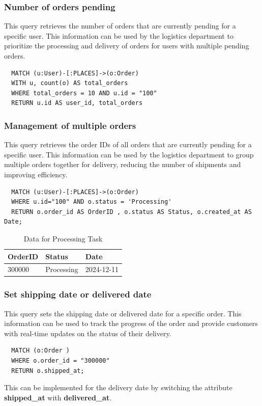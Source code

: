\documentclass[a4paper,12pt]{article}
\begin{document}
\subsubsection{Number of orders pending}
This query retrieves the number of orders that are currently pending for a specific user. This information can be used by the logistics department to prioritize the processing and delivery of orders for users with multiple pending orders.
\begin{verbatim}
  MATCH (u:User)-[:PLACES]->(o:Order)
  WITH u, count(o) AS total_orders
  WHERE total_orders = 10 AND u.id = "100"
  RETURN u.id AS user_id, total_orders
\end{verbatim}

\subsubsection{Management of multiple orders}
This query retrieves the order IDs of all orders that are currently pending for a specific user. This information can be used by the logistics department to group multiple orders together for delivery, reducing the number of shipments and improving efficiency.
\begin{verbatim}
  MATCH (u:User)-[:PLACES]->(o:Order)
  WHERE u.id="100" AND o.status = 'Processing'  
  RETURN o.order_id AS OrderID , o.status AS Status, o.created_at AS Date;

\end{verbatim}
  \begin{table}[h!]
    \centering
    \caption{Data for Processing Task}
    \label{tab:processing_data}
    \begin{tabular}{l l l}
        \toprule
        \textbf{OrderID} & \textbf{Status} & \textbf{Date} \\
        \midrule
        300000 & Processing & 2024-12-11 \\
        \bottomrule
    \end{tabular}
\end{table}

\subsubsection{Set shipping date or delivered date}
This query sets the shipping date or delivered date for a specific order. This information can be used to track the progress of the order and provide customers with real-time updates on the status of their delivery.
\begin{verbatim}
  MATCH (o:Order ) 
  WHERE o.order_id = "300000"
  RETURN o.shipped_at;
\end{verbatim}
This can be implemented for the delivery date by switching the attribute \textbf{shipped\_at} with \textbf{delivered\_at}.
\end{document}
